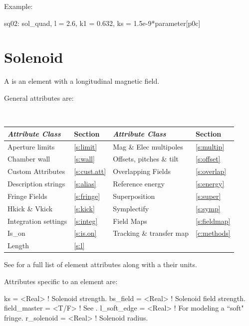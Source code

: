 {Example:
\begin{example}
  sq02: sol_quad, l = 2.6, k1 = 0.632, ks = 1.5e-9*parameter[p0c]
\end{example}

\newpage

\section{Solenoid}
\label{s:sol}

A  is an element with a longitudinal magnetic field.

General  attributes are:
\begin{center}
\tt
\begin{tabular}{llll} \toprule
  {\sl Attribute Class}      & Section           & {\sl Attribute Class}      & Section            \\ \midrule
  Aperture limits            & \ref{s:limit}     & Mag \& Elec multipoles     & \ref{s:multip}     \\
  Chamber wall               & \ref{s:wall}      & Offsets, pitches \& tilt   & \ref{s:offset}     \\
  Custom Attributes          & \ref{s:cust.att}  & Overlapping Fields         & \ref{s:overlap}    \\
  Description strings        & \ref{s:alias}     & Reference energy           & \ref{s:energy}     \\ 
  Fringe Fields              & \ref{s:fringe}    & Superposition              & \ref{s:super}      \\
  Hkick \& Vkick             & \ref{s:kick}      & Symplectify                & \ref{s:symp}       \\
  Integration settings       & \ref{s:integ}     & Field Maps                 & \ref{s:fieldmap}   \\
  Is_on                      & \ref{s:is.on}     & Tracking \& transfer map   & \ref{c:methods}    \\ 
  Length                     & \ref{s:l}         &                            &                    \\ 
  \bottomrule
\end{tabular}
\end{center}
\toffset
See  for a full list of element attributes along with a their units.

Attributes specific to an  element are:
\begin{example}
  ks           = <Real>  ! Solenoid strength.
  bs_field     = <Real>  ! Solenoid field strength.
  field_master = <T/F>   ! See .
  l_soft_edge  = <Real>  ! For modeling a ``soft" fringe.
  r_solenoid   = <Real>  ! Solenoid radius.
\end{example}

}
